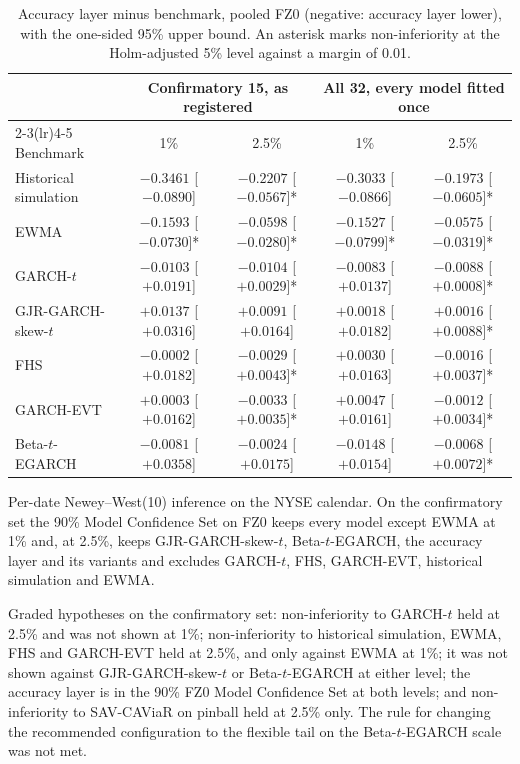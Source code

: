 \begin{table}[htbp]\centering\begin{threeparttable}
\caption{Accuracy layer minus benchmark, pooled FZ0 (negative: accuracy layer lower), with the one-sided 95\% upper bound. An asterisk marks non-inferiority at the Holm-adjusted 5\% level against a margin of 0.01.}\label{tab:crossasset}\footnotesize\setlength{\tabcolsep}{4pt}
\begin{tabular}{lcccc}\toprule
 & \multicolumn{2}{c}{Confirmatory 15, as registered} & \multicolumn{2}{c}{All 32, every model fitted once} \\ \cmidrule(lr){2-3}\cmidrule(lr){4-5}
Benchmark & 1\% & 2.5\% & 1\% & 2.5\% \\ \midrule
Historical simulation & $-0.3461$ [$-0.0890$] & $-0.2207$ [$-0.0567$]* & $-0.3033$ [$-0.0866$] & $-0.1973$ [$-0.0605$]* \\
EWMA & $-0.1593$ [$-0.0730$]* & $-0.0598$ [$-0.0280$]* & $-0.1527$ [$-0.0799$]* & $-0.0575$ [$-0.0319$]* \\
GARCH-$t$ & $-0.0103$ [$+0.0191$] & $-0.0104$ [$+0.0029$]* & $-0.0083$ [$+0.0137$] & $-0.0088$ [$+0.0008$]* \\
GJR-GARCH-skew-$t$ & $+0.0137$ [$+0.0316$] & $+0.0091$ [$+0.0164$] & $+0.0018$ [$+0.0182$] & $+0.0016$ [$+0.0088$]* \\
FHS & $-0.0002$ [$+0.0182$] & $-0.0029$ [$+0.0043$]* & $+0.0030$ [$+0.0163$] & $-0.0016$ [$+0.0037$]* \\
GARCH-EVT & $+0.0003$ [$+0.0162$] & $-0.0033$ [$+0.0035$]* & $+0.0047$ [$+0.0161$] & $-0.0012$ [$+0.0034$]* \\
Beta-$t$-EGARCH & $-0.0081$ [$+0.0358$] & $-0.0024$ [$+0.0175$] & $-0.0148$ [$+0.0154$] & $-0.0068$ [$+0.0072$]* \\
\bottomrule\end{tabular}
\begin{tablenotes}\footnotesize\item Per-date Newey--West(10) inference on the NYSE calendar. On the confirmatory set the 90\% Model Confidence Set on FZ0 keeps every model except EWMA at 1\% and, at 2.5\%, keeps GJR-GARCH-skew-$t$, Beta-$t$-EGARCH, the accuracy layer and its variants and excludes GARCH-$t$, FHS, GARCH-EVT, historical simulation and EWMA.\end{tablenotes}
\end{threeparttable}\end{table}

Graded hypotheses on the confirmatory set: non-inferiority to GARCH-$t$ held at 2.5\% and was not shown at 1\%; non-inferiority to historical simulation, EWMA, FHS and GARCH-EVT held at 2.5\%, and only against EWMA at 1\%; it was not shown against GJR-GARCH-skew-$t$ or Beta-$t$-EGARCH at either level; the accuracy layer is in the 90\% FZ0 Model Confidence Set at both levels; and non-inferiority to SAV-CAViaR on pinball held at 2.5\% only. The rule for changing the recommended configuration to the flexible tail on the Beta-$t$-EGARCH scale was not met.

